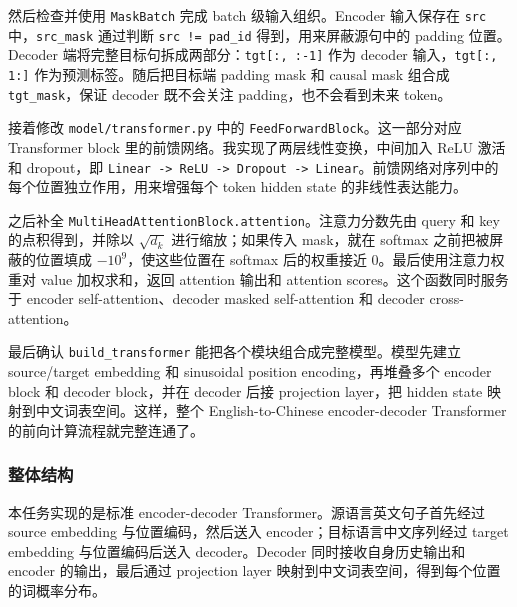 ﻿\documentclass[UTF8,a4paper,12pt]{ctexart}
\begin{document}
然后检查并使用 \texttt{MaskBatch} 完成 batch 级输入组织。Encoder 输入保存在 \texttt{src} 中，\texttt{src\_mask} 通过判断 \texttt{src != pad\_id} 得到，用来屏蔽源句中的 padding 位置。Decoder 端将完整目标句拆成两部分：\texttt{tgt[:, :-1]} 作为 decoder 输入，\texttt{tgt[:, 1:]} 作为预测标签。随后把目标端 padding mask 和 causal mask 组合成 \texttt{tgt\_mask}，保证 decoder 既不会关注 padding，也不会看到未来 token。

接着修改 \texttt{model/transformer.py} 中的 \texttt{FeedForwardBlock}。这一部分对应 Transformer block 里的前馈网络。我实现了两层线性变换，中间加入 ReLU 激活和 dropout，即 \texttt{Linear -> ReLU -> Dropout -> Linear}。前馈网络对序列中的每个位置独立作用，用来增强每个 token hidden state 的非线性表达能力。

之后补全 \texttt{MultiHeadAttentionBlock.attention}。注意力分数先由 query 和 key 的点积得到，并除以 $\sqrt{d_k}$ 进行缩放；如果传入 mask，就在 softmax 之前把被屏蔽的位置填成 $-10^9$，使这些位置在 softmax 后的权重接近 0。最后使用注意力权重对 value 加权求和，返回 attention 输出和 attention scores。这个函数同时服务于 encoder self-attention、decoder masked self-attention 和 decoder cross-attention。

最后确认 \texttt{build\_transformer} 能把各个模块组合成完整模型。模型先建立 source/target embedding 和 sinusoidal position encoding，再堆叠多个 encoder block 和 decoder block，并在 decoder 后接 projection layer，把 hidden state 映射到中文词表空间。这样，整个 English-to-Chinese encoder-decoder Transformer 的前向计算流程就完整连通了。

\subsubsection{整体结构}

本任务实现的是标准 encoder-decoder Transformer。源语言英文句子首先经过 source embedding 与位置编码，然后送入 encoder；目标语言中文序列经过 target embedding 与位置编码后送入 decoder。Decoder 同时接收自身历史输出和 encoder 的输出，最后通过 projection layer 映射到中文词表空间，得到每个位置的词概率分布。
\end{document}
